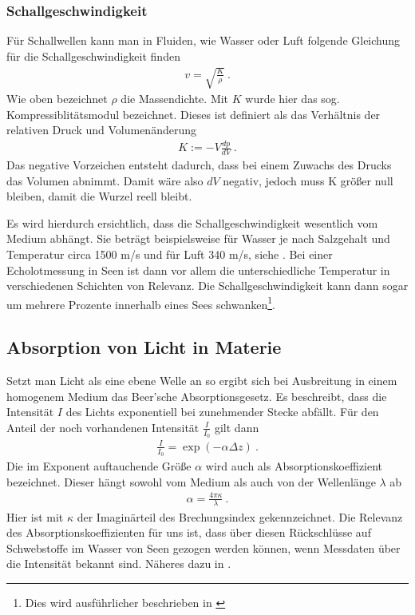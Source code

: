\documentclass[12pt,a4paper,titlepage,headinclude,bibtotoc]{scrartcl}
\numberwithin{equation}{subsection}
\begin{document}
\subsubsection{Schallgeschwindigkeit}
\label{sec:theschallgeschw}
Für Schallwellen kann man in Fluiden, wie Wasser oder Luft folgende Gleichung für die Schallgeschwindigkeit finden
\begin{align}
 v = \sqrt{  \frac{K}{\rho}  }~.
\end{align}
Wie oben bezeichnet $\rho$ die Massendichte. Mit $K$ wurde hier das sog. Kompressiblitätsmodul bezeichnet. Dieses ist definiert als das Verhältnis der relativen Druck und Volumenänderung
\begin{align}
 K := - V \frac{d p}{d V} ~.
\end{align}
Das negative Vorzeichen entsteht dadurch, dass bei einem Zuwachs des Drucks das Volumen abnimmt. Damit wäre also $dV$ negativ, jedoch muss K größer null bleiben, damit die Wurzel reell bleibt.


Es wird hierdurch ersichtlich, dass die Schallgeschwindigkeit wesentlich vom Medium abhängt. 
Sie beträgt beispielsweise für Wasser je nach Salzgehalt und Temperatur circa 1500 m/s  und für Luft 340 m/s, siehe \cite[S.467]{tipler}.
Bei einer Echolotmessung in Seen ist dann vor allem die unterschiedliche Temperatur in verschiedenen Schichten 
von Relevanz. Die Schallgeschwindigkeit kann dann sogar um mehrere Prozente innerhalb eines Sees schwanken\footnote{Dies wird ausführlicher beschrieben in \cite{schicht}}.



\subsection{Absorption von Licht in Materie}
Setzt man Licht als eine ebene Welle an so ergibt sich bei Ausbreitung in einem homogenem Medium das Beer'sche Absorptionsgesetz.
Es beschreibt, dass die Intensität $I$ des Lichts exponentiell bei zunehmender Stecke abfällt.
Für den Anteil der noch vorhandenen Intensität $\frac{I}{I_0}$ gilt dann
\begin{align}
 \frac{I}{I_0}  =  \exp(- \alpha  \Delta z)~.\label{eq:absorblicht}
\end{align}
Die im Exponent auftauchende Größe $\alpha$ wird auch als Absorptionskoeffizient bezeichnet. Dieser hängt sowohl vom Medium als auch von der Wellenlänge $\lambda$ ab
\begin{align}
 \alpha= \frac{4 \pi \kappa}{\lambda}~.
\end{align}
Hier ist mit $\kappa$ der Imaginärteil des Brechungsindex gekennzeichnet.
Die Relevanz des Absorptionskoeffizienten für uns ist, dass über diesen Rückschlüsse auf Schwebstoffe im Wasser von Seen gezogen werden können, wenn Messdaten über die Intensität bekannt sind. Näheres dazu in 
\cite[S.229]{meschede}.
\end{document}
